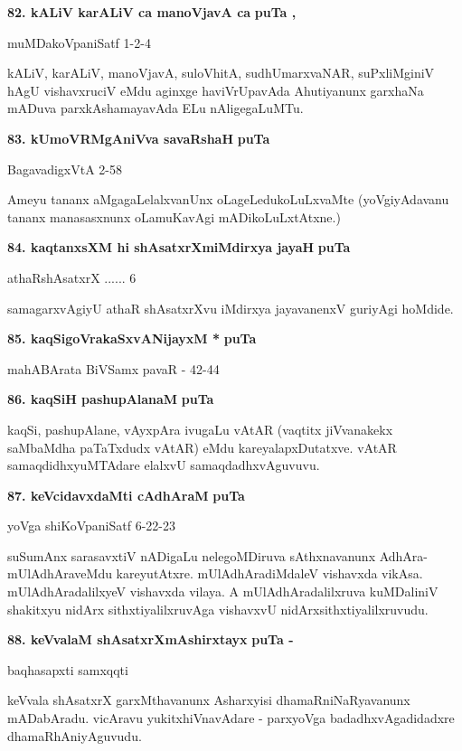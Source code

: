 \eject
\noindent
\textbf{82. kALiV karALiV ca manoVjavA ca} \hfill{\bf puTa , }

\hfill{muMDakoVpaniSatf 1-2-4}

\smallskip
kALiV, karALiV, manoVjavA, suloVhitA, sudhUmarxvaNAR, suPxliMginiV hAgU vishavxruciV eMdu aginxge haviVrUpavAda Ahutiyanunx garxhaNa mADuva parxkAshamayavAda ELu nAligegaLuMTu.

\medskip
\noindent
\textbf{83. kUmoVRMgAniVva savaRshaH} \hfill{\bf puTa }

\hfill{BagavadigxVtA 2-58}

\smallskip
Ameyu tananx aMgagaLelalxvanUnx oLageLedukoLuLxvaMte (yoVgiyAdavanu tananx manasasxnunx oLamuKavAgi mADikoLuLxtAtxne.)

\medskip
\noindent
\textbf{84. kaqtanxsXM hi shAsatxrXmiMdirxya jayaH} \hfill{\bf puTa }

\hfill{athaRshAsatxrX ...... 6}

\smallskip
samagarxvAgiyU athaR shAsatxrXvu iMdirxya jayavanenxV guriyAgi hoMdide.

\medskip
\noindent
\textbf{85. kaqSigoVrakaSxvANijayxM *} \hfill{\bf puTa }

\hfill{mahABArata BiVSamx pavaR - 42-44}

\medskip
\noindent
\textbf{86. kaqSiH pashupAlanaM} \hfill{\bf puTa }

\smallskip
kaqSi, pashupAlane, vAyxpAra ivugaLu vAtAR (vaqtitx jiVvanakekx saMbaMdha paTaTxdudx vAtAR) eMdu kareyalapxDutatxve. vAtAR samaqdidhxyuMTAdare elalxvU samaqdadhxvAguvuvu.

\medskip
\noindent
\textbf{87. keVcidavxdaMti cAdhAraM} \hfill{\bf puTa }

\hfill{yoVga shiKoVpaniSatf 6-22-23}

\smallskip
suSumAnx sarasavxtiV nADigaLu nelegoMDiruva sAthxnavanunx AdhAra-mUlAdhAraveMdu kareyutAtxre. mUlAdhAradiMdaleV vishavxda vikAsa. mUlAdhAradalilxyeV vishavxda vilaya. A mUlAdhAradalilxruva kuMDaliniV shakitxyu nidArx sithxtiyalilxruvAga vishavxvU nidArxsithxtiyalilxruvudu.

\medskip
\noindent
\textbf{88. keVvalaM shAsatxrXmAshirxtayx} \hfill{\bf puTa -}

\hfill{baqhasapxti samxqqti}

\smallskip
keVvala shAsatxrX garxMthavanunx Asharxyisi dhamaRniNaRyavanunx mADabAradu. vicAravu yukitxhiVnavAdare - parxyoVga badadhxvAgadidadxre dhamaRhAniyAguvudu.


